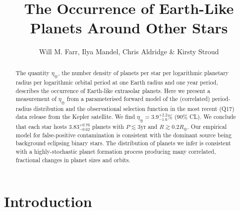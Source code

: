 \documentclass[apjl]{emulateapj}
\newcommand{\etaearth}{\eta_\oplus}
\newcommand{\REarth}{R_\oplus}
\newcommand{\earange}{3.9_{-1.6}^{+2.2}\%}
\newcommand{\rplrange}{3.83_{-0.62}^{+0.76}}
\begin{document}
\title{The Occurrence of Earth-Like Planets Around Other Stars}
\author{Will M. Farr, Ilya Mandel, Chris Aldridge \& Kirsty Stroud}

\begin{abstract}
  The quantity $\etaearth$, the number density of planets per star per
  logarithmic planetary radius per logarithmic orbital period at one
  Earth radius and one year period, describes the occurrence of
  Earth-like extrasolar planets.  Here we present a measurement of
  $\etaearth$ from a parameterised forward model of the (correlated)
  period-radius distribution and the observational selection function
  in the most recent (Q17) data release from the Kepler satellite.  We
  find $\etaearth = \earange$ (90\% CL).  We conclude that each star
  hosts $\rplrange$ planets with $P \lesssim 3 \mathrm{yr}$ and $R
  \gtrsim 0.2 \REarth$.  Our empirical model for false-positive
  contamination is consistent with the dominant source being
  background eclipsing binary stars.  The distribution of planets we
  infer is consistent with a highly-stochastic planet formation
  process producing many correlated, fractional changes in planet
  sizes and orbits.
\end{abstract}


\maketitle

\section{Introduction}
\end{document}
